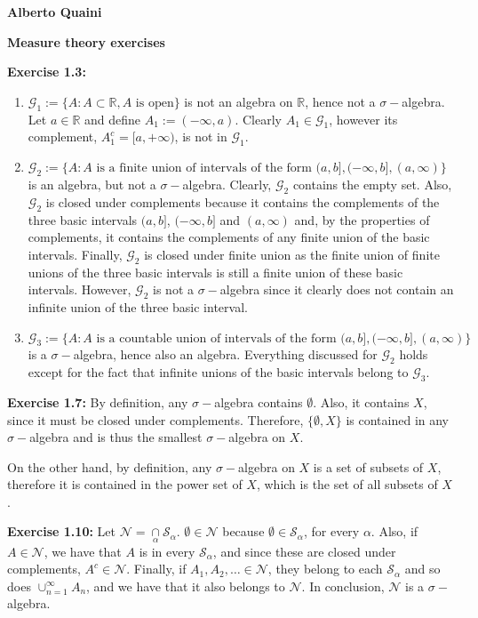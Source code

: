 \documentclass[11.5pt, letterpaper, bibtotoc,
    tablecaptionabove, figurecaptionabove]{article}
\begin{document}
\textbf{Alberto Quaini}

\textbf{\Large Measure theory exercises}

\textbf{Exercise 1.3:}
\begin{enumerate}
\item
$\mathcal G_1 := \{A: A\subset\mathbb R, A \text{ is open}\}$ is not an algebra on $\mathbb R$, hence not a $\sigma-$algebra.
Let $a\in\mathbb R$ and define $A_1:=(-\infty, a)$. 
Clearly $A_1\in\mathcal G_1$, however its complement, $A_1^c = [a, +\infty)$, is not in $\mathcal G_1$.

\item
$\mathcal G_2 := \{A: A \text{ is a finite union of intervals of the form } (a, b], (-\infty, b], (a, \infty)\}$ 
is an algebra, but not a $\sigma-$algebra.
Clearly, $\mathcal G_2$ contains the empty set.
Also, $\mathcal G_2$ is closed under complements because it contains the complements of the three basic intervals 
$(a, b]$, $(-\infty, b]$ and $(a, \infty)$ and, by the properties of complements, 
it contains the complements of any finite union of the basic intervals.
Finally, $\mathcal G_2$ is closed under finite union as the finite union of finite unions 
of the three basic intervals is still a finite union of these basic intervals.
However, $\mathcal G_2$ is not a $\sigma-$algebra since it clearly does not contain an infinite union 
of the three basic interval.

\item
$\mathcal G_3 := \{A: A \text{ is a countable union of intervals of the form } (a, b], (-\infty, b], (a, \infty)\}$ is a $\sigma-$algebra, hence also an algebra.
Everything discussed for $\mathcal G_2$ holds except for the fact that infinite unions of the basic intervals belong to $\mathcal G_3$. 

\end{enumerate}

\textbf{Exercise 1.7:}
By definition, any $\sigma-$algebra contains $\emptyset$.
Also, it contains $X$, since it must be closed under complements.
Therefore, $\{\emptyset, X\}$ is contained in any $\sigma-$algebra and is thus the smallest $\sigma-$algebra on $X$.

On the other hand, by definition, any $\sigma-$algebra on $X$ is a set of subsets of $X$, 
therefore it is contained in the power set of $X$, which is the set of all subsets of $X$.

\textbf{Exercise 1.10:}
Let $\mathcal N = \underset{\alpha}{\cap}\mathcal S_\alpha$.
$\emptyset\in\mathcal N$ because $\emptyset\in\mathcal S_\alpha$, for every $\alpha$.
Also, if $A\in\mathcal N$, we have that $A$ is in every $\mathcal S_\alpha$,
and since these are closed under complements, $A^c\in\mathcal N$.
Finally, if $A_1, A_2,\ldots\in\mathcal N$, they belong to each $\mathcal S_\alpha$ and so does 
$\cup_{n=1}^\infty A_n$, and we have that it also belongs to $\mathcal N$.
In conclusion, $\mathcal N$ is a $\sigma-$algebra.
\end{document}
